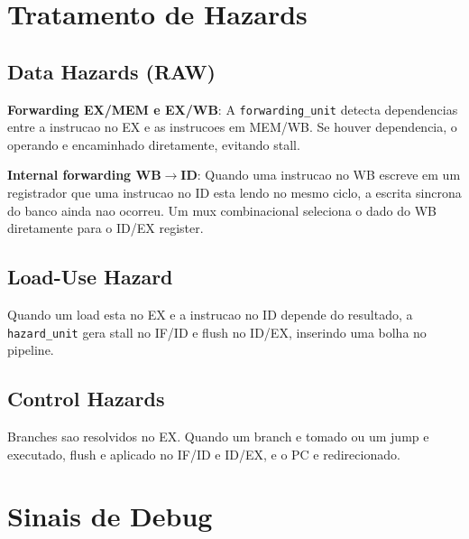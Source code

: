 \documentclass[12pt,a4paper]{article}
\begin{document}
\section{Tratamento de Hazards}

\subsection{Data Hazards (RAW)}
\textbf{Forwarding EX/MEM e EX/WB}: A \texttt{forwarding\_unit} detecta
dependencias entre a instrucao no EX e as instrucoes em MEM/WB. Se houver
dependencia, o operando e encaminhado diretamente, evitando stall.

\textbf{Internal forwarding WB$\rightarrow$ID}: Quando uma instrucao no WB
escreve em um registrador que uma instrucao no ID esta lendo no mesmo ciclo,
a escrita sincrona do banco ainda nao ocorreu. Um mux combinacional seleciona
o dado do WB diretamente para o ID/EX register.

\subsection{Load-Use Hazard}
Quando um load esta no EX e a instrucao no ID depende do resultado, a
\texttt{hazard\_unit} gera stall no IF/ID e flush no ID/EX, inserindo uma
bolha no pipeline.

\subsection{Control Hazards}
Branches sao resolvidos no EX. Quando um branch e tomado ou um jump e
executado, flush e aplicado no IF/ID e ID/EX, e o PC e redirecionado.

\section{Sinais de Debug}
\end{document}
